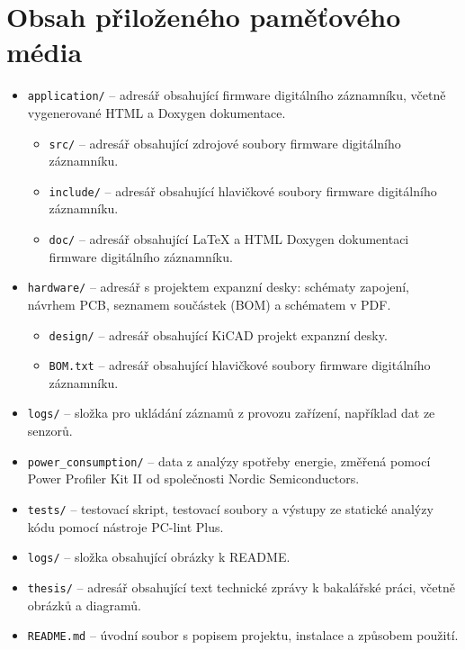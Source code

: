
%

\chapter{Obsah přiloženého paměťového média}


\begin{itemize}
    \item \texttt{application/} -- adresář obsahující firmware digitálního záznamníku, včetně vygenerované HTML a Doxygen dokumentace.
    \begin{itemize}
        \item \texttt{src/} -- adresář obsahující zdrojové soubory firmware digitálního záznamníku.
        \item \texttt{include/} -- adresář obsahující hlavičkové soubory firmware digitálního záznamníku.
        \item \texttt{doc/} -- adresář obsahující LaTeX a HTML Doxygen dokumentaci firmware digitálního záznamníku.
    \end{itemize}
    \item \texttt{hardware/} -- adresář s projektem expanzní desky: schématy zapojení, návrhem PCB, seznamem součástek (BOM) a schématem v PDF.

    \begin{itemize}
        \item \texttt{design/} -- adresář obsahující KiCAD projekt expanzní desky.
        \item \texttt{BOM.txt} -- adresář obsahující hlavičkové soubory firmware digitálního záznamníku.
    \end{itemize}
    
    \item \texttt{logs/} -- složka pro ukládání záznamů z provozu zařízení, například dat ze senzorů.
    
    \item \texttt{power\_consumption/} -- data z analýzy spotřeby energie, změřená pomocí Power Profiler Kit II od společnosti Nordic Semiconductors.
    
    \item \texttt{tests/} -- testovací skript, testovací soubory a výstupy ze statické analýzy kódu pomocí nástroje PC-lint Plus.

    \item \texttt{logs/} -- složka obsahující obrázky k README.

    \item \texttt{thesis/} -- adresář obsahující text technické zprávy k bakalářské práci, včetně obrázků a diagramů.
    
    \item \texttt{README.md} -- úvodní soubor s popisem projektu, instalace a způsobem použití.
\end{itemize}

%
